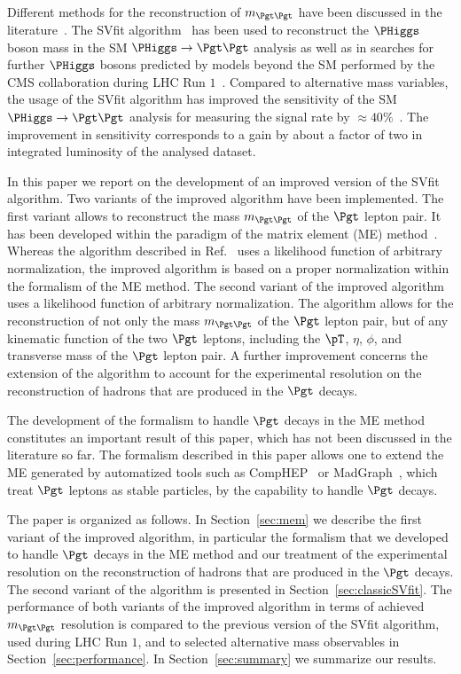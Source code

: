 Different methods for the reconstruction of $m_{\Pgt\Pgt}$ 
have been discussed in the literature~\cite{massRecoCollinearApprox,neutrinoRecByVertexInfo,MMC,Barr:2011he,Gripaios:2012th}. 
The SVfit algorithm~\cite{SVfit} has been used to reconstruct the $\PHiggs$ boson mass in the SM $\PHiggs \to \Pgt\Pgt$ analysis
as well as in searches for further $\PHiggs$ bosons predicted by models beyond the SM 
performed by the CMS collaboration during LHC Run $1$~\cite{HIG-10-002,HIG-11-029,HIG-13-004,HIG-13-021,HIG-14-029,HIG-14-033,HIG-14-034,HIG-15-001,HIG-15-013}.
Compared to alternative mass variables,
the usage of the SVfit algorithm has improved the sensitivity of the SM $\PHiggs \to \Pgt\Pgt$ analysis for measuring the signal rate by $\approx 40\%$~\cite{HIG-13-004}.
The improvement in sensitivity corresponds to a gain by about a factor of two in integrated luminosity of the analysed dataset.

In this paper we report on the development of an improved version of the SVfit algorithm.
Two variants of the improved algorithm have been implemented.
The first variant allows to reconstruct the mass $m_{\Pgt\Pgt}$ of the $\Pgt$ lepton pair.
It has been developed within the paradigm of the matrix element (ME) method~\cite{Kondo:1988yd,Kondo:1991dw}.
Whereas the algorithm described in Ref.~\cite{SVfit} uses a likelihood function of arbitrary normalization,
the improved algorithm is based on a proper normalization within the formalism of the ME method.
The second variant of the improved algorithm uses a likelihood function of arbitrary normalization.
The algorithm allows for the reconstruction of not only the mass $m_{\Pgt\Pgt}$ of the $\Pgt$ lepton pair,
but of any kinematic function of the two $\Pgt$ leptons,
including the $\pT$, $\eta$, $\phi$, and transverse mass of the $\Pgt$ lepton pair.
A further improvement concerns the extension of the algorithm to account for the experimental resolution 
on the reconstruction of hadrons that are produced in the $\Pgt$ decays.

The development of the formalism to handle $\Pgt$ decays in the ME method constitutes an important result of this paper,
which has not been discussed in the literature so far.
The formalism described in this paper allows one to extend the ME generated by automatized tools such as CompHEP~\cite{CompHEP1,CompHEP2} or MadGraph~\cite{MadGraph},
which treat $\Pgt$ leptons as stable particles, by the capability to handle $\Pgt$ decays.

The paper is organized as follows. 
In Section~\ref{sec:mem} we describe the first variant of the improved algorithm, 
in particular the formalism that we developed to handle $\Pgt$ decays in the ME method
and our treatment of the experimental resolution on the reconstruction of hadrons that are produced in the $\Pgt$ decays.
The second variant of the algorithm is presented in Section~\ref{sec:classicSVfit}.
The performance of both variants of the improved algorithm in terms of achieved $m_{\Pgt\Pgt}$ resolution 
is compared to the previous version of the SVfit algorithm, used during LHC Run $1$, and to selected alternative mass observables in Section~\ref{sec:performance}.
In Section~\ref{sec:summary} we summarize our results.
